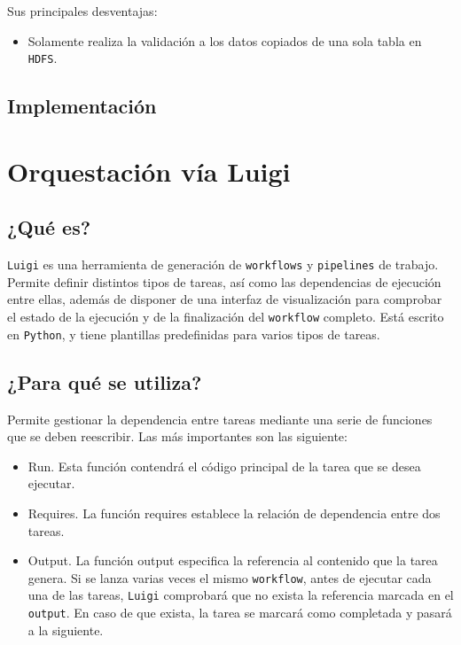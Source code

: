 \documentclass[]{article}
\begin{document}
Sus principales desventajas:

\begin{itemize}
\itemsep1pt\parskip0pt
\item
  Solamente realiza la validación a los datos copiados de una sola tabla
  en \texttt{HDFS}.
\end{itemize}

\subsection{Implementación}\label{implementacion-3}

\section{Orquestación vía Luigi}\label{orquestacion-via-luigi}

\subsection{¿Qué es?}\label{que-es-3}

\texttt{Luigi} es una herramienta de generación de \texttt{workflows} y
\texttt{pipelines} de trabajo. Permite definir distintos tipos de
tareas, así como las dependencias de ejecución entre ellas, además de
disponer de una interfaz de visualización para comprobar el estado de la
ejecución y de la finalización del \texttt{workflow} completo. Está
escrito en \texttt{Python}, y tiene plantillas predefinidas para varios
tipos de tareas.

\subsection{¿Para qué se utiliza?}\label{para-que-se-utiliza-3}

Permite gestionar la dependencia entre tareas mediante una serie de
funciones que se deben reescribir. Las más importantes son las
siguiente:

\begin{itemize}
\itemsep1pt\parskip0pt
\item
  Run. Esta función contendrá el código principal de la tarea que se
  desea ejecutar.
\item
  Requires. La función requires establece la relación de dependencia
  entre dos tareas.
\item
  Output. La función output especifica la referencia al contenido que la
  tarea genera. Si se lanza varias veces el mismo \texttt{workflow},
  antes de ejecutar cada una de las tareas, \texttt{Luigi} comprobará
  que no exista la referencia marcada en el \texttt{output}. En caso de
  que exista, la tarea se marcará como completada y pasará a la
  siguiente.
\end{itemize}
\end{document}

